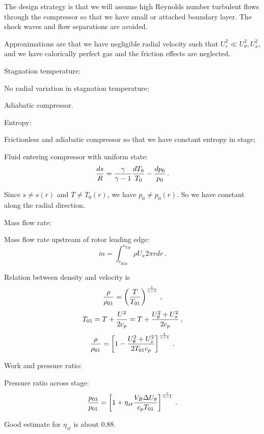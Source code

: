The design strategy is that we will assume high Reynolds number turbulent flows through the compressor so that we have small or attached boundary layer. The shock waves and flow separations are avoided.

Approximations are that we have negligible radial velocity such that $U_r^2 \ll U_\theta^2, U_x^2$, and we have calorically perfect gas and the friction effects are neglected.

\begin{enumeratePacked}
\item Stagnation temperature:
  \begin{itemizePacked}
  \item No radial variation in stagnation temperature;
  \item Adiabatic compressor.
  \end{itemizePacked}
\item Entropy:
  \begin{itemizePacked}
  \item Frictionless and adiabatic compressor so that we have constant entropy in stage;
  \item Fluid entering compressor with uniform state:
    \[
      {\frac{ds}{R}} = {\frac{\gamma}{\gamma-1}} {\frac{dT_0}{T_0}} - {\frac{dp_0}{p_0}}\,.
    \]
  \end{itemizePacked}
  Since $s \neq s(r)$ and $T \neq T_0(r)$, we have $p_0 \neq p_0(r)$. So we have constant along the radial direction.
\item Mass flow rate:
  \begin{itemizePacked}
  \item Mass flow rate upstream of rotor leading edge:
    \[
      \dot{m} = \int_{r_\text{Hub}}^{r_\text{Tip}} \rho U_x 2 \pi r dr\,.
    \]
  \item Relation between density and velocity is
    \[
      {\frac{\rho}{\rho_{01}}} = \left({\frac{T}{T_{01}}}\right)^{\frac{1}{\gamma-1}} \,,
    \]
    \[
      T_{01} = T + {\frac{U^2}{2 c_p}} = T + {\frac{U_\theta^2 + U_x^2}{2 c_p}}\,,
    \]
    \[
      {\frac{\rho}{\rho_{01}}} = \left[1- {\frac{U_\theta^2 + U_x^2}{2 T_{01} c_p}}\right]^{\frac{1}{\gamma-1}}\,.
    \]
  \end{itemizePacked}
\item Work and pressure ratio:
  \begin{itemizePacked}
  \item Pressure ratio across stage:
    \[
      {\frac{p_{03}}{p_{01}}} = \left[ 1+\eta_{st} {\frac{V_B \Delta U_\theta}{c_p T_{01}}} \right]^{\frac{\gamma}{\gamma-1}}\,.
    \]
  \item Good estimate for $\eta_{st}$ is about 0.88.

\end{itemizePacked}
\end{enumeratePacked}
